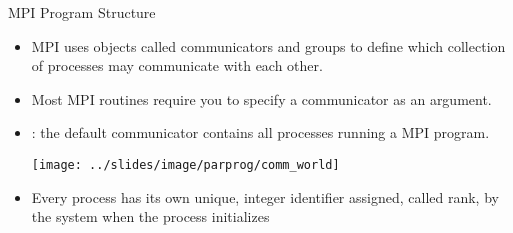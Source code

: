 \documentclass[9pt,c]{beamer}
\begin{document}
\begin{frame}{MPI Program Structure}
\begin{itemize}
\begin{center}
\begin{tabular}{|f|a|}
          \hline
        \end{tabular}
      \end{center}
  \framebreak
  \item MPI uses objects called communicators and groups to define which collection of processes may communicate with each other.
  \item Most MPI routines require you to specify a communicator as an argument.
  \item {}: the default communicator contains all processes running a MPI program.
    \begin{center}
      \texttt{[image: ../slides/image/parprog/comm\_world]}      
    \end{center}
  \item Every process has its own unique, integer identifier assigned, called rank, by the system when the process initializes
  \end{itemize}
\end{frame}
\end{document}
